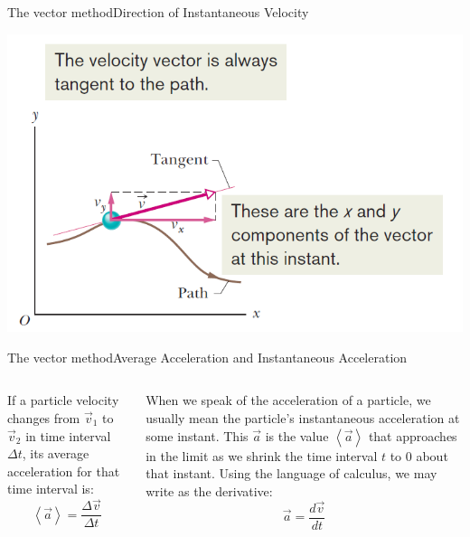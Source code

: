 \documentclass[18pt]{LectMechanics}
\begin{document}
\begin{frame}{The vector method}{Direction of Instantaneous Velocity}

	\includegraphics[width=0.85\linewidth]{Instantaneous_Velocity}
\end{frame}




\begin{frame}{The vector method}{Average Acceleration and Instantaneous Acceleration}
	\begin{columns}
		\begin{column}{0.5\linewidth}
			If a particle velocity changes from  $\vec v_1$ to $\vec v_2$ in time interval $\Delta t$,
			its average acceleration for that time interval is:
			\begin{equation*}
				\left\langle \vec a \right\rangle = \frac{\Delta \vec v}{\Delta t}
			\end{equation*}
		\end{column}
		\begin{column}{0.5\linewidth}
			When we speak of the acceleration of a particle, we usually mean the particle’s
			instantaneous acceleration at some instant. This $\vec a$ is the value $\left\langle \vec a \right\rangle$ that approaches in the limit as we shrink the time interval $t$ to 0 about that instant. Using the language of calculus, we may write as the derivative:
			\begin{equation*}
				\vec a = \frac{d \vec v}{d t}
			\end{equation*}
		\end{column}
	\end{columns}
\end{frame}
\end{document}
